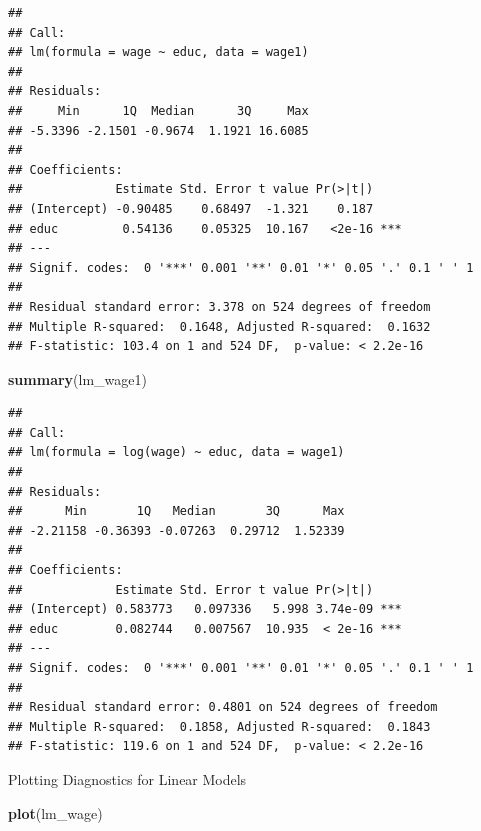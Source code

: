 \documentclass[]{book}
\newenvironment{Shaded}{\begin{snugshade}}{\end{snugshade}}
\newcommand{\KeywordTok}[1]{\textcolor[rgb]{0.13,0.29,0.53}{\textbf{#1}}}
\newcommand{\NormalTok}[1]{#1}
\begin{document}
\begin{verbatim}
## 
## Call:
## lm(formula = wage ~ educ, data = wage1)
## 
## Residuals:
##     Min      1Q  Median      3Q     Max 
## -5.3396 -2.1501 -0.9674  1.1921 16.6085 
## 
## Coefficients:
##             Estimate Std. Error t value Pr(>|t|)    
## (Intercept) -0.90485    0.68497  -1.321    0.187    
## educ         0.54136    0.05325  10.167   <2e-16 ***
## ---
## Signif. codes:  0 '***' 0.001 '**' 0.01 '*' 0.05 '.' 0.1 ' ' 1
## 
## Residual standard error: 3.378 on 524 degrees of freedom
## Multiple R-squared:  0.1648, Adjusted R-squared:  0.1632 
## F-statistic: 103.4 on 1 and 524 DF,  p-value: < 2.2e-16
\end{verbatim}

\begin{Shaded}
\begin{Highlighting}[]
\KeywordTok{summary}\NormalTok{(lm_wage1)}
\end{Highlighting}
\end{Shaded}

\begin{verbatim}
## 
## Call:
## lm(formula = log(wage) ~ educ, data = wage1)
## 
## Residuals:
##      Min       1Q   Median       3Q      Max 
## -2.21158 -0.36393 -0.07263  0.29712  1.52339 
## 
## Coefficients:
##             Estimate Std. Error t value Pr(>|t|)    
## (Intercept) 0.583773   0.097336   5.998 3.74e-09 ***
## educ        0.082744   0.007567  10.935  < 2e-16 ***
## ---
## Signif. codes:  0 '***' 0.001 '**' 0.01 '*' 0.05 '.' 0.1 ' ' 1
## 
## Residual standard error: 0.4801 on 524 degrees of freedom
## Multiple R-squared:  0.1858, Adjusted R-squared:  0.1843 
## F-statistic: 119.6 on 1 and 524 DF,  p-value: < 2.2e-16
\end{verbatim}

Plotting Diagnostics for Linear Models

\begin{Shaded}
\begin{Highlighting}[]
\KeywordTok{plot}\NormalTok{(lm_wage)}
\end{Highlighting}
\end{Shaded}
\end{document}
